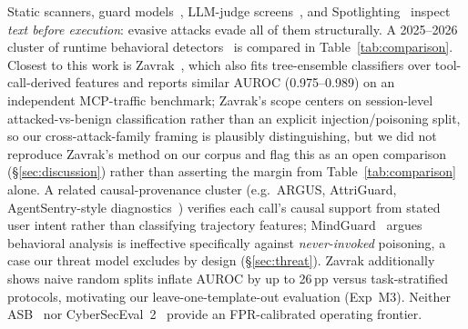 \documentclass[conference]{IEEEtran}
\begin{document}
Static scanners, guard models~\cite{inan2023llama}, LLM-judge
screens~\cite{yi2023benchmarking}, and Spotlighting~\cite{hines2024spotlighting}
inspect \emph{text before execution}: evasive attacks evade all of them
structurally.  A 2025--2026 cluster of runtime behavioral
detectors~\cite{liu2025traceaegis,sequeira2026agentsentry,
yu2026frauddetection,zavrak2026contentaware} is compared in
Table~\ref{tab:comparison}. Closest to this work is
Zavrak~\cite{zavrak2026contentaware}, which also fits tree-ensemble
classifiers over tool-call-derived features and reports similar
AUROC (0.975--0.989) on an independent MCP-traffic benchmark;
Zavrak's scope centers on session-level attacked-vs-benign
classification rather than an explicit injection/poisoning split, so
our cross-attack-family framing is plausibly distinguishing, but we
did not reproduce Zavrak's method on our corpus and flag this as an
open comparison (\S\ref{sec:discussion}) rather than asserting the
margin from Table~\ref{tab:comparison} alone. A related causal-provenance
cluster (e.g.\ ARGUS, AttriGuard, AgentSentry-style
diagnostics~\cite{sequeira2026agentsentry}) verifies each call's
causal support from stated user intent rather than classifying
trajectory features; MindGuard~\cite{wang2025mindguard} argues
behavioral analysis is ineffective specifically against
\emph{never-invoked} poisoning, a case our threat model excludes
by design (\S\ref{sec:threat}). Zavrak additionally shows naive
random splits inflate AUROC by up to 26\,pp versus task-stratified
protocols, motivating our leave-one-template-out evaluation (Exp~M3).
Neither ASB~\cite{zhang2024agentsecuritybench} nor
CyberSecEval~2~\cite{bhatt2024cyberseceval2} provide an
FPR-calibrated operating frontier.
\end{document}
